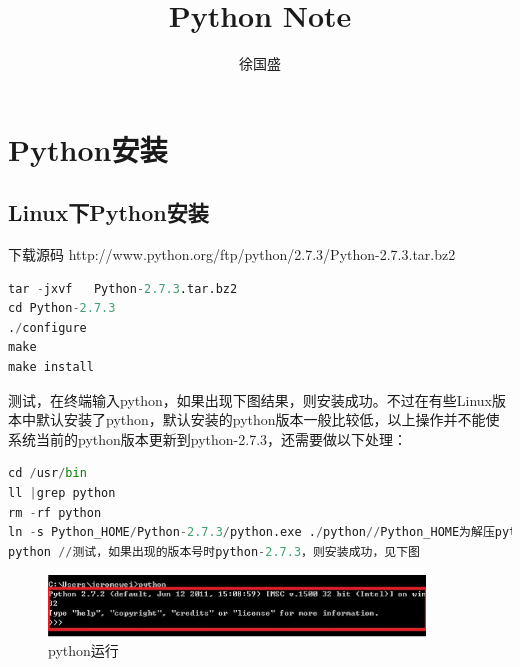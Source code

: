 \documentclass[UTF8]{ctexart}
\title{Python Note}
\author{徐国盛}
\begin{document}
\maketitle
\tableofcontents
\section{Python安装}
\subsection{Linux下Python安装}
\textbullet 下载源码 http://www.python.org/ftp/python/2.7.3/Python-2.7.3.tar.bz2

\textbullet
\begin{lstlisting}[language = Python]
tar -jxvf	Python-2.7.3.tar.bz2
cd Python-2.7.3
./configure
make
make install
\end{lstlisting}

\textbullet 测试，在终端输入python，如果出现下图结果，则安装成功。不过在有些Linux版本中默认安装了python，默认安装的python版本一般比较低，以上操作并不能使系统当前的python版本更新到python-2.7.3，还需要做以下处理：
\begin{lstlisting}[language = Python]
cd /usr/bin
ll |grep python
rm -rf python
ln -s Python_HOME/Python-2.7.3/python.exe ./python//Python_HOME为解压python的目录，重新创建一个连接文件，指向新安装的Python
python //测试，如果出现的版本号时python-2.7.3，则安装成功，见下图
\end{lstlisting}
\begin{figure}[ht]
\centering
\includegraphics[width=10cm]{./runpython.png}
\caption{python运行}
\end{figure}
\end{document}
